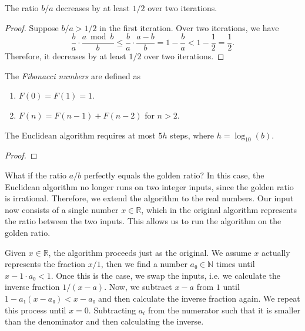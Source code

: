 \begin{proposition}
  The ratio $b/a$ decreases by at least $1/2$ over two iterations.
\end{proposition}

\begin{proof}
  Suppose $b/a > 1/2$ in the first iteration.
  Over two iterations, we have
  \[
    \frac{b}{a} · \frac{a \bmod b}{b}
    ≤ \frac{b}{a} · \frac{a - b}{b}
    = 1 - \frac{b}{a}
    < 1 - \frac{1}{2}
    = \frac{1}{2}.
  \]
  Therefore, it decreases by at least $1/2$ over two iterations.
\end{proof}

\begin{definition}
  The \emph{Fibonacci numbers} are defined as
  \begin{enumerate}
    \item $F(0) = F(1) = 1$.
    \item $F(n) = F(n - 1) + F(n - 2)$ for $n > 2$.
  \end{enumerate}
\end{definition}

\begin{proposition}
  The Euclidean algorithm requires at most $5h$ steps,
  where $h = \log_{10}(b)$.
\end{proposition}

\begin{proof}
\end{proof}

What if the ratio $a/b$ perfectly equals the golden ratio?
In this case, the Euclidean algorithm no longer runs on two integer inputs,
since the golden ratio is irrational.
Therefore, we extend the algorithm to the real numbers.
Our input now consists of a single number $x ∈ ℝ$, which in the original
algorithm represents the ratio between the two inputs.
This allows us to run the algorithm on the golden ratio.

Given $x ∈ ℝ$, the algorithm proceeds just as the original.
We assume $x$ actually represents the fraction $x/1$,
then we find a number $a₀ ∈ ℕ$ times until $x - 1 · a₀ < 1$.
Once this is the case, we swap the inputs, i.e. we calculate the inverse fraction $1/(x - a)$.
Now, we subtract $x - a$ from $1$ until $1 - a₁ (x - a₀) < x - a₀$
and then calculate the inverse fraction again.
We repeat this process until $x = 0$.
Subtracting $a_i$ from the numerator such that it is smaller than the
denominator and then calculating the inverse.

